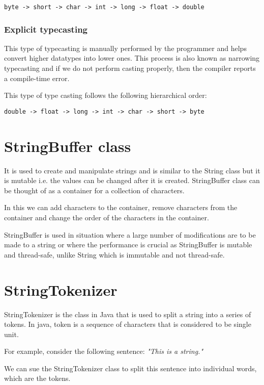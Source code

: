 \documentclass[a4paper, 12pt]{scrarticle}
\begin{document}
\begin{verbatim}
byte -> short -> char -> int -> long -> float -> double
\end{verbatim}

\subsubsection{Explicit typecasting}
This type of typecasting is manually performed by the programmer and helps convert higher datatypes into lower ones. This process is also known as narrowing typecasting and if we do not perform casting properly, then the compiler reports a compile-time error.

This type of type casting follows the following hierarchical order:

\begin{verbatim}
double -> float -> long -> int -> char -> short -> byte  
\end{verbatim}

\section{StringBuffer class}
It is used to create and manipulate strings and is similar to the String class but it is mutable i.e. the values can be changed after it is created. StringBuffer class can be thought of as a container for a collection of characters.

In this we can add characters to the container, remove characters from the container and change the order of the characters in the container.

StringBuffer is  used in situation where a large number of modifications are to be made to a string or where the performance is crucial as StringBuffer is mutable and thread-safe, unlike String which is immutable and not thread-safe.


\section{StringTokenizer}
StringTokenizer is the class in Java that is used to split a string into a series of tokens. In java, token is a sequence of characters that is considered to be single unit.

For example, consider the following sentence: \emph{"This is a string."}

We can sue the StringTokenizer class to split this sentence into individual words, which are the tokens.
\end{document}
